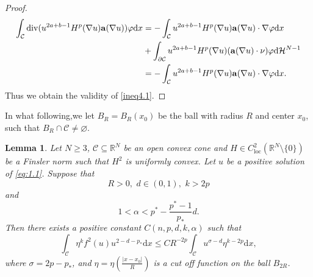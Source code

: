 \documentclass[12pt]{amsart}
\newtheorem{lem}[thm]{Lemma}
\theoremstyle{definition}
\theoremstyle{remark}
\theoremstyle{conclusion}
\theoremstyle{conjecture}
\numberwithin{equation}{section}
\begin{document}
\begin{proof}
\begin{equation*}
  \begin{aligned}
    \int_{\mathcal{C}}\operatorname{div}(u^{2a+b-1}H^p(\nabla u){\bf{a}}(\nabla u))\varphi\mathrm{d}x
    &=-\int_{\mathcal{C}}u^{2a+b-1}H^p(\nabla u){\bf{a}}(\nabla u)\cdot\nabla\varphi\mathrm{d}x\\
    &+\int_{\partial\mathcal{C}}u^{2a+b-1}H^p(\nabla u)({\bf{a}}(\nabla u)\cdot\nu)\varphi\mathrm{d}\mathcal{H}^{N-1}\\
    &=-\int_{\mathcal{C}}u^{2a+b-1}H^p(\nabla u){\bf{a}}(\nabla u)\cdot\nabla\varphi\mathrm{d}x.
  \end{aligned}
\end{equation*}
Thus we obtain the validity of \eqref{ineq4.1}.
\end{proof}
In what following,we  let $B_R=B_{R}(x_0)$ be the ball with radius $R$ and center $x_0$, such that $B_R\cap\mathcal{C}\neq\varnothing $.
\begin{lem}\label{lem4.2}
Let $N\geq3$, $\mathcal{C}\subseteq\mathbb{R}^{N}$ be an open convex cone and $H\in C^{2}_{\text{loc}}(\mathbb{R}^{N}\setminus\{0\})$ be a Finsler norm such that $H^{2}$ is uniformly convex. Let $u$ be a positive solution of \eqref{eq:1.1}. Suppose that
 $$R>0,\,\,d\in(0,1),\,\,k>2p$$
 and
 \begin{equation}\label{d}
  1<\alpha<p^*-\frac{p^*-1}{p_*}d.
 \end{equation}
 Then there exists a positive constant $C(n,p,d,k,\alpha)$ such that
 \begin{equation}\label{eq4.2}
  \int_{\mathcal{C}}\eta^kf^2(u)u^{2-d-p_*}\mathrm{d}x\leq CR^{-2p}\int_{\mathcal{C}}u^{\sigma-d}\eta^{k-2p}\mathrm{d}x,
 \end{equation}
 where $\sigma=2p-p_*$, and $\eta=\eta(\frac{|x-x_0|}{R})$ is a cut off function on the ball $B_{2R}$.
\end{lem}
\end{document}
